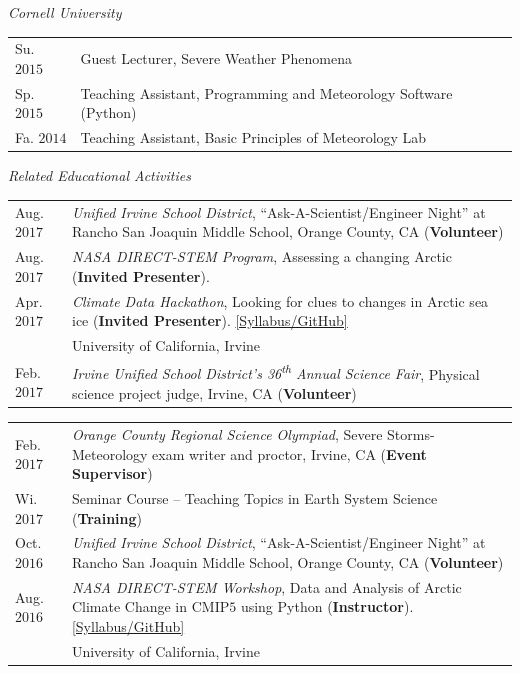 \documentclass[margin,line,palatino,courier,10pt]{res}
\begin{document}
\begin{resume}
\textit{Cornell University}
\vspace*{0.05in}\\
\begin{tabular}{@{}p{0.8in}p{4in}}
Su. $2015$ & Guest Lecturer, Severe Weather Phenomena\\
Sp. $2015$ & Teaching Assistant, Programming and Meteorology Software (Python)\\
Fa. $2014$ & Teaching Assistant, Basic Principles of Meteorology Lab\\
\end{tabular}

\textit{Related Educational Activities}
\vspace*{0.05in}\\
\begin{tabular}{@{}p{0.8in}p{4in}}
Aug. $2017$ & \textit{Unified Irvine School District}, ``Ask-A-Scientist/Engineer Night'' at Rancho San Joaquin Middle School, Orange County, CA (\textbf{Volunteer})\\
Aug. $2017$ & \textit{NASA DIRECT-STEM Program}, Assessing a changing Arctic (\textbf{Invited Presenter}).\\
Apr. $2017$ & \textit{Climate Data Hackathon}, Looking for clues to changes in Arctic 
sea ice (\textbf{Invited Presenter}). \href{https://github.com/UCIDataScienceInitiative/Climate_Hackathon}{[Syllabus/GitHub]}\\
& University of California, Irvine\\
Feb. $2017$ & \textit{Irvine Unified School District's 36\textsuperscript{th} Annual Science Fair}, Physical science project judge, Irvine, CA (\textbf{Volunteer})\\
\end{tabular}
\begin{tabular}{@{}p{0.8in}p{4in}}
Feb. $2017$ & \textit{Orange County Regional Science Olympiad}, Severe Storms-Meteorology exam writer and proctor, Irvine, CA (\textbf{Event Supervisor})\\
Wi. $2017$ & Seminar Course -- Teaching Topics in Earth System Science (\textbf{Training})\\
Oct. $2016$ & \textit{Unified Irvine School District}, ``Ask-A-Scientist/Engineer Night'' at Rancho San Joaquin Middle School, Orange County, CA (\textbf{Volunteer})\\
Aug. $2016$ & \textit{NASA DIRECT-STEM Workshop}, Data and Analysis of Arctic Climate Change in CMIP$5$ using Python (\textbf{Instructor}). \href{https://github.com/strongh/DIRECT-STEM-climate-workshop}{[Syllabus/GitHub]}\\
& University of California, Irvine\\
\end{tabular}


\end{resume}
\end{document}
